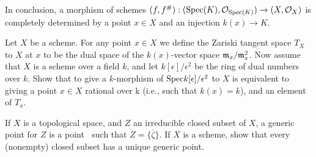 \begin{sol}
	In conclusion, a morphism of schemes $(f,f^{\#}): (\mathrm{Spec} (K), \mathcal{O}_{\mathrm{Spec}(K)}) \to (X, \mathcal{O}_X)$ is completely determined by a point $x \in X$ and an injection $k(x) \to K$.
\end{sol}

\begin{ex}
	Let $X$ be a scheme. For any point $x \in X$ we define the Zariski tangent space $T_X$ to $X$ at $x$ to be the dual space of the $k(x)$-vector space $\mathfrak{m}_x/\mathfrak{m}_x^2$. Now assume that $X$ is a scheme over a field $k$, and let $k[\epsilon]/\epsilon^2$ be the ring of dual numbers over $k$. Show that to give a $k$-morphism of $\mathrm{Spec} k[\epsilon]/\epsilon^2$ to $X$ is equivalent to giving a point $x \in X$ rational over k (i.e., such that $k(x) = k$), and an element of $T_x$.
\end{ex}

\begin{ex}
	If $X$ is a topological space, and $Z$ an irreducible closed subset of $X$, a generic point for $Z$ is a point $\ $ such that $Z = \overline{\{\zeta\}}$. If $X$ is a scheme, show that every (nonempty) closed subset has a unique generic point.
\end{ex}

